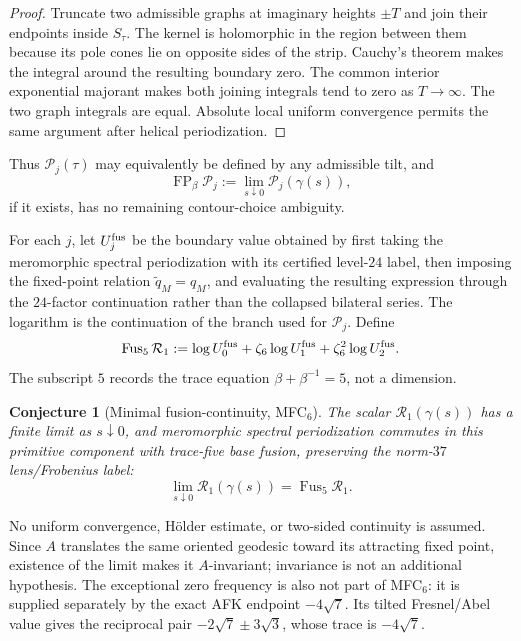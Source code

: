 \documentclass[11pt]{article}
\newtheorem{conjecture}[theorem]{Conjecture}
\begin{document}
\begin{proof}
Truncate two admissible graphs at imaginary heights $\pm T$ and join
their endpoints inside $S_\tau$.  The kernel is holomorphic in the
region between them because its pole cones lie on opposite sides of
the strip.  Cauchy's theorem makes the integral around the resulting
boundary zero.  The common interior exponential majorant makes both
joining integrals tend to zero as $T\to\infty$.  The two graph
integrals are equal.  Absolute local uniform convergence permits the
same argument after helical periodization.
\end{proof}

Thus $\mathcal P_j(\tau)$ may equivalently be defined by any admissible
tilt, and
\[
 \operatorname{FP}_{\beta}\mathcal P_j
 :=\lim_{s\downarrow0}\mathcal P_j(\gamma(s)),
\]
if it exists, has no remaining contour-choice ambiguity.

For each \(j\), let \(U_j^{\rm fus}\) be the boundary value obtained by
first taking the meromorphic spectral periodization with its certified
level-\(24\) label, then imposing the fixed-point relation
\(\widetilde q_M=q_M\), and evaluating the resulting expression through
the \(24\)-factor continuation rather than the collapsed bilateral
series.  The logarithm is the continuation of the branch used for
\(\mathcal P_j\).  Define
\[
 \operatorname{Fus}_5\mathcal R_1
 :=\log U_0^{\rm fus}
 +\zeta_6\log U_1^{\rm fus}
 +\zeta_6^2\log U_2^{\rm fus}.
\]
The subscript \(5\) records the trace equation
\(\beta+\beta^{-1}=5\), not a dimension.

\begin{conjecture}[Minimal fusion-continuity, MFC$_6$]
\label{conj:fusion}
The scalar $\mathcal R_1(\gamma(s))$ has a finite limit as
$s\downarrow0$, and meromorphic spectral periodization commutes in this
primitive component with trace-five base fusion, preserving the
norm-$37$ lens/Frobenius label:
\[
 \lim_{s\downarrow0}\mathcal R_1(\gamma(s))
 =\operatorname{Fus}_5\mathcal R_1.
\]
\end{conjecture}

No uniform convergence, H\"older estimate, or two-sided continuity is
assumed.  Since $A$ translates the same oriented geodesic toward its
attracting fixed point, existence of the limit makes it $A$-invariant;
invariance is not an additional hypothesis.  The exceptional zero
frequency is also not part of MFC$_6$: it is supplied separately by the
exact AFK endpoint $-4\sqrt7$.  Its tilted Fresnel/Abel value gives the
reciprocal pair $-2\sqrt7\pm3\sqrt3$, whose trace is $-4\sqrt7$.
\end{document}
